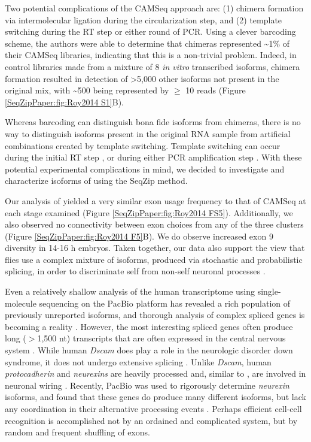 		Two potential complications of the CAMSeq approach are: (1) chimera formation via intermolecular ligation during the circularization step, and (2) template switching during the RT step or either round of PCR. Using a clever barcoding scheme, the authors were able to determine that chimeras represented \textasciitilde1\% of their CAMSeq libraries, indicating that this is a non-trivial problem. Indeed, in control libraries made from a mixture of 8 \textit{in vitro} transcribed \dscam{} isoforms, chimera formation resulted in detection of >5,000 other isoforms not present in the original mix, with \textasciitilde 500 being represented by $\ge$ 10 reads (Figure \ref{SeqZipPaper:fig:Roy2014 S1}B).

		Whereas barcoding can distinguish bona fide isoforms from chimeras, there is no way to distinguish isoforms present in the original RNA sample from artificial combinations created by template switching. Template switching can occur during the initial RT step \citep{Houseley2010a}, or during either PCR amplification step \citep{Meyerhans1990a,Judo1998}. With these potential experimental complications in mind, we decided to investigate and characterize isoforms of \dscam{} using the SeqZip method.

		Our analysis of \dscam{} yielded a very similar exon usage frequency to that of CAMSeq at each stage examined (Figure \ref{SeqZipPaper:fig:Roy2014 FS5}). Additionally, we also observed no connectivity between exon choices from any of the three clusters (Figure \ref{SeqZipPaper:fig:Roy2014 F5}B). We do observe increased exon 9 diversity in 14-16 h embryos. Taken together, our data also support the view that flies use a complex mixture of \dscam{} isoforms, produced via stochastic and probabilistic splicing, in order to discriminate self from non-self neuronal processes \citep{LawrenceZipursky2013}.

		Even a relatively shallow analysis of the human transcriptome using single-molecule sequencing on the PacBio platform has revealed a rich population of previously unreported isoforms, and thorough analysis of complex spliced genes is becoming a reality \citep{Sharon2013}. However, the most interesting spliced genes often produce long ($>$1,500 nt) transcripts that are often expressed in the central nervous system \citep{Park2007}. While human \textit{Dscam} does play a role in the neurologic disorder down syndrome, it does not undergo extensive splicing \citep{Yamakawa1998a}. Unlike \textit{Dscam}, human \textit{protocadherin} and \textit{neurexins} are heavily processed and, similar to \dscam{}, are involved in neuronal wiring \citep{Ushkaryov1992,Wu1999}. Recently, PacBio was used to rigorously determine \textit{neurexin} isoforms, and found that these genes do produce many different isoforms, but lack any coordination in their alternative processing events \citep{Treutlein2014}. Perhaps efficient cell-cell recognition is accomplished not by an ordained and complicated system, but by random and frequent shuffling of exons.

